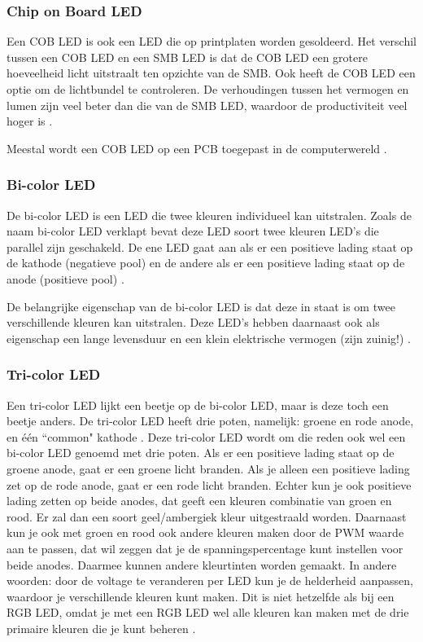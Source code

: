 \subsubsection{Chip on Board LED}
Een COB LED is ook een LED die op printplaten worden gesoldeerd. Het verschil 
tussen een COB LED en een SMB LED is dat de COB LED een grotere hoeveelheid licht uitstraalt 
ten opzichte van de SMB. Ook heeft de COB LED een optie om de lichtbundel te controleren.
De verhoudingen tussen het vermogen en lumen zijn veel beter dan die van de SMB LED, 
waardoor de productiviteit veel hoger is \cite{COBLEDs}. 

Meestal wordt een COB LED op een PCB toegepast in de computerwereld \cite{BSLCOB2503W030XXFR600320}.
\\
\subsubsection{Bi-color LED}
De bi-color LED is een LED die twee kleuren individueel kan uitstralen. 
Zoals de naam bi-color LED verklapt bevat deze LED soort twee kleuren LED's die parallel zijn geschakeld. De 
ene LED gaat aan als er een positieve lading staat op de kathode (negatieve pool) en de andere 
als er een positieve lading staat op de anode (positieve pool) \cite{TLUV5300}.

De belangrijke eigenschap van de bi-color LED is dat deze in staat is om twee verschillende kleuren kan uitstralen. 
Deze LED's hebben daarnaast ook als eigenschap een lange levensduur en een klein elektrische vermogen (zijn zuinig!) \cite{BiColorLED}.
\\
\subsubsection{Tri-color LED}
Een tri-color LED lijkt een beetje op de bi-color LED, maar is deze toch een beetje anders. 
De tri-color LED heeft drie poten, namelijk: groene en rode anode, en één ``common" kathode \cite{TriColourLED}. 
Deze tri-color LED wordt om die reden ook wel een bi-color LED genoemd met drie poten.
Als er een positieve lading staat op de groene anode, gaat er een groene licht branden. 
Als je alleen een positieve lading zet op de rode anode, gaat er een rode licht branden. 
Echter kun je ook positieve lading zetten op beide anodes, dat geeft een kleuren combinatie van groen en rood. 
Er zal dan een soort geel/ambergiek kleur uitgestraald worden. Daarnaast kun je ook met groen 
en rood ook andere kleuren maken door de PWM waarde aan te passen, 
dat wil zeggen dat je de spanningspercentage kunt instellen voor beide anodes. Daarmee kunnen andere kleurtinten worden gemaakt.  
In andere woorden: door de voltage te veranderen per LED kun je de helderheid aanpassen, 
waardoor je verschillende kleuren kunt maken. Dit is niet hetzelfde als bij een RGB LED, omdat je met een RGB LED wel alle kleuren kan maken met de drie primaire kleuren die je kunt beheren \cite{LD5911V2}.
\\
